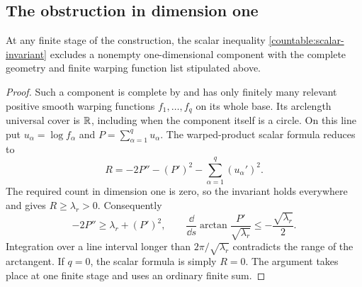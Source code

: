 \subsection{The obstruction in dimension one}

\begin{lemma}\label{countable:dimension-one}
At any finite stage of the construction, the scalar inequality
\eqref{countable:scalar-invariant} excludes a nonempty one-dimensional
component with the complete geometry and finite warping function list stipulated above.
\end{lemma}

\begin{proof}
Such a component is complete by  and has only
finitely many relevant positive smooth warping functions $f_1,\ldots,f_q$ on
its whole base. Its arclength universal cover is $\mathbb R$, including
when the component itself is a circle. On this line put
$u_\alpha=\log f_\alpha$ and $P=\sum_{\alpha=1}^q u_\alpha$.
The warped-product scalar formula reduces to
\[
 R=-2P''-(P')^2-\sum_{\alpha=1}^q(u_\alpha')^2.
\]
The required count in dimension one is zero, so the invariant holds
everywhere and gives $R\ge\lambda_r>0$. Consequently
\[
 -2P''\ge\lambda_r+(P')^2,\qquad
 \frac{\dd}{\dd s}\arctan\frac{P'}{\sqrt{\lambda_r}}
 \le-\frac{\sqrt{\lambda_r}}2.
\]
Integration over a line interval longer than
$2\pi/\sqrt{\lambda_r}$ contradicts the range of the arctangent.
If $q=0$, the scalar formula is simply $R=0$. The argument takes
place at one finite stage and uses an ordinary finite sum.
\end{proof}


